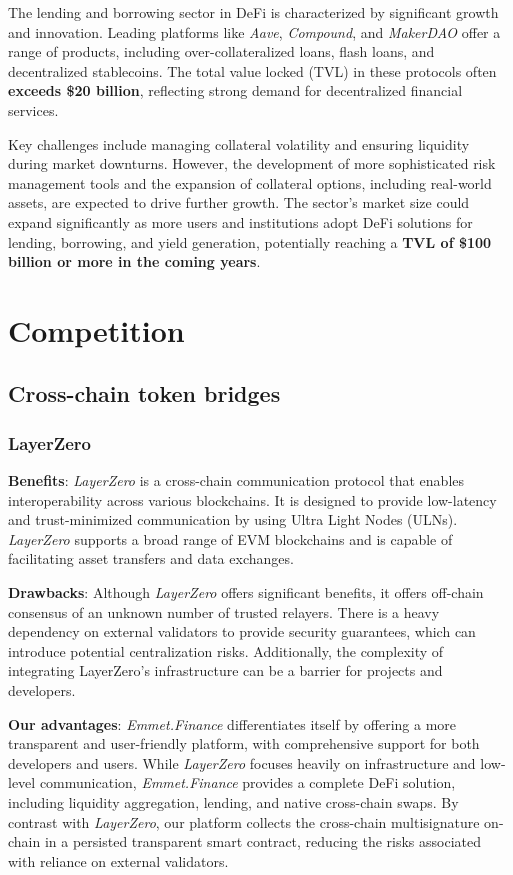 \documentclass[12pt, a4paper]{article}
\begin{document}
The lending and borrowing sector in DeFi is characterized by significant growth and innovation. Leading platforms like \textit{Aave}, \textit{Compound}, and \textit{MakerDAO} offer a range of products, including over-collateralized loans, flash loans, and decentralized stablecoins. The total value locked (TVL) in these protocols often \textbf{exceeds \$20 billion}, reflecting strong demand for decentralized financial services.

Key challenges include managing collateral volatility and ensuring liquidity during market downturns. However, the development of more sophisticated risk management tools and the expansion of collateral options, including real-world assets, are expected to drive further growth. The sector's market size could expand significantly as more users and institutions adopt DeFi solutions for lending, borrowing, and yield generation, potentially reaching a \textbf{TVL of \$100 billion or more in the coming years}.

\section{Competition}

\subsection{Cross-chain token bridges}

\subsubsection{LayerZero}

\textbf{Benefits}: \textit{LayerZero} is a cross-chain communication protocol that enables interoperability across various blockchains. It is designed to provide low-latency and trust-minimized communication by using Ultra Light Nodes (ULNs). \textit{LayerZero} supports a broad range of EVM blockchains and is capable of facilitating asset transfers and data exchanges.

\textbf{Drawbacks}: Although \textit{LayerZero} offers significant benefits, it offers off-chain consensus of an unknown number of trusted relayers. There is a heavy dependency on external validators to provide security guarantees, which can introduce potential centralization risks. Additionally, the complexity of integrating LayerZero's infrastructure can be a barrier for projects and developers.

\textbf{Our advantages}: \textit{Emmet.Finance} differentiates itself by offering a more transparent and user-friendly platform, with comprehensive support for both developers and users. While \textit{LayerZero} focuses heavily on infrastructure and low-level communication, \textit{Emmet.Finance} provides a complete DeFi solution, including liquidity aggregation, lending, and native cross-chain swaps. By contrast with \textit{LayerZero}, our platform collects the cross-chain multisignature on-chain in a persisted transparent smart contract, reducing the risks associated with reliance on external validators.
\end{document}

